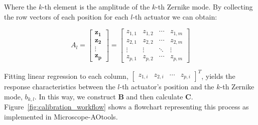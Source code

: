 Where the $k$-th element is the amplitude of the $k$-th Zernike mode. By collecting the row vectors of each position for each $l$-th actuator we can obtain:

\begin{equation}\label{eq:zernike_amp_actuator}
A_l = 
\begin{bmatrix}
\boldsymbol{z_{1}}\\
\boldsymbol{z_{2}}\\
\vdots\\
\boldsymbol{z_{p}} 
\end{bmatrix}
=
\begin{bmatrix}
z_{1,1} & z_{1,2} & \cdots & z_{1,m} \\
z_{2,1} & z_{2,2} & \cdots & z_{2,m} \\
\vdots  & \vdots  & \ddots & \vdots  \\
z_{p,1} & z_{p,2} & \cdots & z_{p,m} 
\end{bmatrix}
\end{equation}

Fitting linear regression to each column, $\begin{bmatrix} z_{1,i} & z_{2,i} & \cdots & z_{p,i} \end{bmatrix}^T$, yields the response characteristics between the $l$-th actuator's position and the $k$-th Zernike mode, $b_{k,l}$. In this way, we construct $\boldsymbol{B}$ and then calculate $\boldsymbol{C}$. Figure~\ref{fig:calibration_workflow} shows a flowchart representing this process as implemented in Microscope-AOtools.

